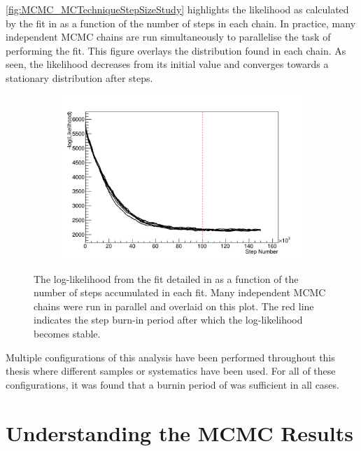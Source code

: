 \autoref{fig:MCMC_MCTechniqueStepSizeStudy} highlights the likelihood as calculated by the fit in  as a function of the number of steps in each chain. In practice, many independent MCMC chains are run simultaneously to parallelise the task of performing the fit. This figure overlays the distribution found in each chain. As seen, the likelihood decreases from its initial value and converges towards a stationary distribution after  steps.

\begin{figure}[h]
  \begin{subfigure}[t]{0.8\textwidth}
    \includegraphics[width=\textwidth, trim={0mm 0mm 0mm 0mm}, clip,page=1]{Figures/MCMC/MCTechnique_LLHStep.pdf}
  \end{subfigure}
  \caption{The log-likelihood from the fit detailed in  as a function of the number of steps accumulated in each fit. Many independent MCMC chains were run in parallel and overlaid on this plot. The red line indicates the  step burn-in period after which the log-likelihood becomes stable.}
  \label{fig:MCMC_MCTechniqueLLHVsStep}
\end{figure}

Multiple configurations of this analysis have been performed throughout this thesis where different samples or systematics have been used. For all of these configurations, it was found that a burnin period of  was sufficient in all cases.

\section{Understanding the MCMC Results}
\label{sec:MarkovChainMonteCarlo_UnderstandingMCMCResults}

